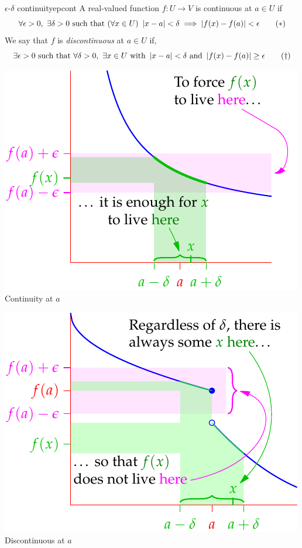 \begin{defn}{$\epsilon$-$\delta$ continuity}{epcont}
	A real-valued function $f:U\to V$ is continuous at $a\in U$ if\footnotemark{}
	\[
		\forall\epsilon>0,\ \exists\delta>0
		\text{ such that }(\forall x\in U)\ 
		\nm{x-a}<\delta\implies\nm{f(x)-f(a)}<\epsilon
		\tag{$\ast$}
	\]
	We say that $f$ is \emph{discontinuous} at $a\in U$ if,
	\[
		\exists\epsilon>0\ \text{such that}\ 
		\forall\delta>0,\ \exists x\in U\ \text{with }
		\nm{x-a}<\delta\ \text{and}\ \nm{f(x)-f(a)}\ge\epsilon
		\tag{$\dag$}
	\]
	
	\begin{minipage}[t]{0.49\linewidth}\vspace{-12pt}
		\centering
		\includegraphics[scale=0.95]{contdef-pic5}\\
		Continuity at $a$
	\end{minipage}
	\hfill
	\begin{minipage}[t]{0.49\linewidth}\vspace{-12pt}
		\centering
		\includegraphics[scale=0.95]{contdef-pic3}\\
		Discontinuous at $a$
	\end{minipage}
\end{defn}

